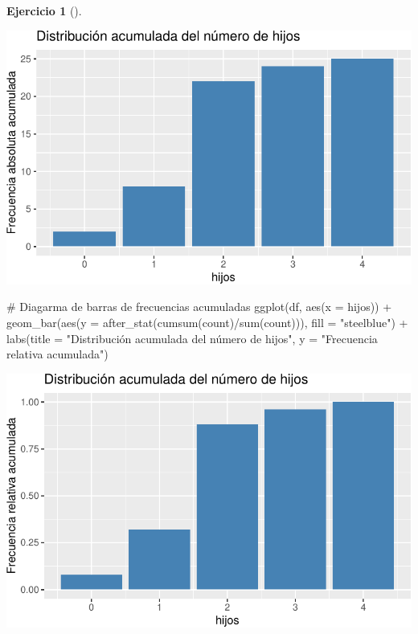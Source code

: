\documentclass[
  a4paper,
]{scrreport}
\newenvironment{Shaded}{\begin{snugshade}}{\end{snugshade}}
\newcommand{\AttributeTok}[1]{\textcolor[rgb]{0.40,0.45,0.13}{#1}}
\newcommand{\CommentTok}[1]{\textcolor[rgb]{0.37,0.37,0.37}{#1}}
\newcommand{\FunctionTok}[1]{\textcolor[rgb]{0.28,0.35,0.67}{#1}}
\newcommand{\NormalTok}[1]{\textcolor[rgb]{0.00,0.23,0.31}{#1}}
\newcommand{\SpecialCharTok}[1]{\textcolor[rgb]{0.37,0.37,0.37}{#1}}
\newcommand{\StringTok}[1]{\textcolor[rgb]{0.13,0.47,0.30}{#1}}
\theoremstyle{definition}
\newtheorem{exercise}{Ejercicio}[chapter]
\theoremstyle{remark}
\begin{document}
\begin{exercise}[]
\begin{enumerate}
\begin{tcolorbox}
  \includegraphics{03-frecuencias-graficos_files/figure-pdf/unnamed-chunk-7-3.pdf}

\begin{Shaded}
\begin{Highlighting}[]
\CommentTok{\# Diagarma de barras de frecuencias acumuladas}
\FunctionTok{ggplot}\NormalTok{(df, }\FunctionTok{aes}\NormalTok{(}\AttributeTok{x =}\NormalTok{ hijos)) }\SpecialCharTok{+}
    \FunctionTok{geom\_bar}\NormalTok{(}\FunctionTok{aes}\NormalTok{(}\AttributeTok{y =} \FunctionTok{after\_stat}\NormalTok{(}\FunctionTok{cumsum}\NormalTok{(count)}\SpecialCharTok{/}\FunctionTok{sum}\NormalTok{(count))), }\AttributeTok{fill =} \StringTok{"steelblue"}\NormalTok{) }\SpecialCharTok{+}
    \FunctionTok{labs}\NormalTok{(}\AttributeTok{title =} \StringTok{"Distribución acumulada del número de hijos"}\NormalTok{, }\AttributeTok{y =} \StringTok{"Frecuencia relativa acumulada"}\NormalTok{)}
\end{Highlighting}
\end{Shaded}

  \includegraphics{03-frecuencias-graficos_files/figure-pdf/unnamed-chunk-7-4.pdf}


\end{tcolorbox}
\end{enumerate}
\end{exercise}
\end{document}
